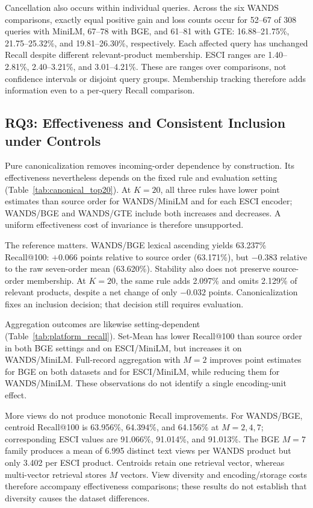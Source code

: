 Cancellation also occurs within individual queries. Across the six WANDS comparisons, exactly equal positive gain and loss counts occur for 52--67 of 308 queries with MiniLM, 67--78 with BGE, and 61--81 with GTE: 16.88--21.75\%, 21.75--25.32\%, and 19.81--26.30\%, respectively. Each affected query has unchanged Recall despite different relevant-product membership. ESCI ranges are 1.40--2.81\%, 2.40--3.21\%, and 3.01--4.21\%. These are ranges over comparisons, not confidence intervals or disjoint query groups. Membership tracking therefore adds information even to a per-query Recall comparison.

\subsection{RQ3: Effectiveness and Consistent Inclusion under Controls}
\label{sec:results_rq3}

Pure canonicalization removes incoming-order dependence by construction. Its effectiveness nevertheless depends on the fixed rule and evaluation setting (Table~\ref{tab:canonical_top20}). At $K=20$, all three rules have lower point estimates than source order for WANDS/MiniLM and for each ESCI encoder; WANDS/BGE and WANDS/GTE include both increases and decreases. A uniform effectiveness cost of invariance is therefore unsupported.



The reference matters. WANDS/BGE lexical ascending yields 63.237\% Recall@100: $+0.066$ points relative to source order (63.171\%), but $-0.383$ relative to the raw seven-order mean (63.620\%). Stability also does not preserve source-order membership. At $K=20$, the same rule adds 2.097\% and omits 2.129\% of relevant products, despite a net change of only $-0.032$ points. Canonicalization fixes an inclusion decision; that decision still requires evaluation.

Aggregation outcomes are likewise setting-dependent (Table~\ref{tab:platform_recall}). Set-Mean has lower Recall@100 than source order in both BGE settings and on ESCI/MiniLM, but increases it on WANDS/MiniLM. Full-record aggregation with $M=2$ improves point estimates for BGE on both datasets and for ESCI/MiniLM, while reducing them for WANDS/MiniLM. These observations do not identify a single encoding-unit effect.



More views do not produce monotonic Recall improvements. For WANDS/BGE, centroid Recall@100 is 63.956\%, 64.394\%, and 64.156\% at $M=2,4,7$; corresponding ESCI values are 91.066\%, 91.014\%, and 91.013\%. The BGE $M=7$ family produces a mean of 6.995 distinct text views per WANDS product but only 3.402 per ESCI product. Centroids retain one retrieval vector, whereas multi-vector retrieval stores $M$ vectors. View diversity and encoding/storage costs therefore accompany effectiveness comparisons; these results do not establish that diversity causes the dataset differences.

